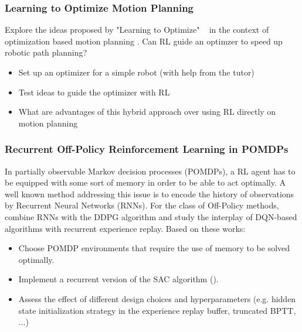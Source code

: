 \documentclass[a4paper]{article}
\begin{document}
\subsubsection{Learning to Optimize Motion Planning}
Explore the ideas proposed by "Learning to Optimize" ~\cite{LiM16b} in the context of optimization based motion planning \cite{Zucker2013}. Can RL guide an optimzer to speed up robotic path planning?
\begin{itemize}
  \item Set up an optimizer for a simple robot (with help from the tutor)
  \item Test ideas to guide the optimizer with RL
  \item What are advantages of this hybrid approach over using RL directly on motion planning
\end{itemize}

\subsubsection{Recurrent Off-Policy Reinforcement Learning in POMDPs}
In partially observable Markov decision processes (POMDPs), a RL agent has to be equipped with some sort of memory in order to be able to act optimally. A well known method addressing this issue is to encode the history of observations by Recurrent Neural Networks (RNNs).
For the class of Off-Policy methods, \cite{heess2015memory} combine RNNs with the DDPG algorithm and \cite{kapturowski2018recurrent} study the interplay of DQN-based algorithms with recurrent experience replay.
Based on these works:
\begin{itemize}
  \item Choose POMDP environments that require the use of memory to be solved optimally.
  \item Implement a recurrent version of the SAC algorithm (\cite{Haarnoja2018a}).
  \item Assess the effect of different design choices and hyperparameters (e.g. hidden state initialization strategy in the experience replay buffer, truncated BPTT, ...)
\end{itemize}
\end{document}
